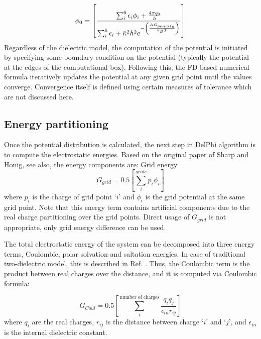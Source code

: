 \documentclass[9pt,tutorial]{livecoms}
\begin{document}
\begin{equation}
    \phi_0 = 
    \left[ 
        \frac{\sum_i^6{\epsilon_i\phi_i } + 
                \frac{4\pi q_0}{h}
             }
             {\sum_i^6{\epsilon_i} + \Bar{\kappa}^2h^2e^{-\left(\frac{\Delta G_{penalty}}{k_BT}\right)}}
    \right]
\end{equation}
Regardless of the dielectric model, the computation of the potential is initiated by specifying  some boundary condition on the potential (typically the potential at the edges of the computational box). Following this, the FD based numerical formula iteratively updates the potential at any given grid point until the values converge. Convergence itself is defined using certain measures of tolerance which are not discussed here. 
 
\subsection{Energy partitioning}
Once the potential distribution is calculated, the next step in DelPhi algorithm is to compute the electrostatic energies. Based on the original paper of Sharp and Honig\cite{sharp1990electrostatic}, see also\cite{rocchia2001extending}, the energy components are:
Grid energy
\begin{equation}
    G_{grid} = 0.5 \left[ \sum_i^{grids}{p_i\phi_i} \right]
\end{equation}
where $ p_i $ is the charge of grid point `$ i $' and $ \phi_i $ is the grid potential at the same grid point. Note that this energy term contains artificial components due to the real charge partitioning over the grid points. Direct usage of $ G_{grid} $ is not appropriate, only grid energy difference can be used.

The total electrostatic energy of the system can be decomposed into three energy terms\cite{rocchia2001extending}, Coulombic, polar solvation and saltation energies. In case of traditional two-dielectric model, this is described in Ref. \cite{rocchia2001extending}. Thus, the Coulombic term is the product between real charges over the distance, and it is computed via Coulombic formula:

\begin{equation}
    G_{Coul} = 0.5 \left[ \sum_i^{\text{number of charges}}{\frac{q_i q_j}{\epsilon_{in}r_{ij}}} \right]
\end{equation}	
where $ q_i $ are the real charges, $r_{ij} $ is the distance between charge `$i$' and `$j$', and $ \epsilon_{in} $ is the internal dielectric constant. 
\end{document}
